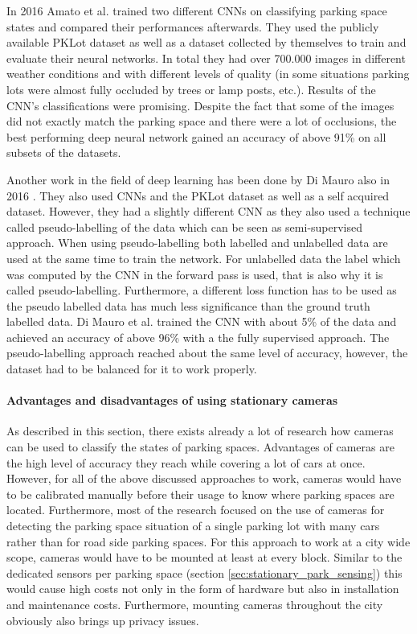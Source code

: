 In 2016 Amato et al. \cite{Amato2016} trained two different CNNs on classifying parking space states and compared their performances afterwards. They used the publicly available PKLot dataset as well as a dataset collected by themselves to train and evaluate their neural networks. In total they had over 700.000 images in different weather conditions and with different levels of quality (in some situations parking lots were almost fully occluded by trees or lamp posts, etc.). Results of the CNN's classifications were promising. Despite the fact that some of the images did not exactly match the parking space and there were a lot of occlusions, the best performing deep neural network gained an accuracy of above 91\% on all subsets of the datasets.

Another work in the field of deep learning has been done by Di Mauro also in 2016 \cite{DiMauro2016}. They also used CNNs and the PKLot dataset as well as a self acquired dataset. However, they had a slightly different CNN as they also used a technique called pseudo-labelling of the data which can be seen as semi-supervised approach. When using pseudo-labelling both labelled and unlabelled data are used at the same time to train the network. For unlabelled data the label which was computed by the CNN in the forward pass is used, that is also why it is called pseudo-labelling. Furthermore, a different loss function has to be used as the pseudo labelled data has much less significance than the ground truth labelled data. Di Mauro et al. trained the CNN with about 5\% of the data and achieved an accuracy of above 96\% with a the fully supervised approach. The pseudo-labelling approach reached about the same level of accuracy, however, the dataset had to be balanced for it to work properly.


\paragraph{Advantages and disadvantages of using stationary cameras}

As described in this section, there exists already a lot of research how cameras can be used to classify the states of parking spaces. Advantages of cameras are the high level of accuracy they reach while covering a lot of cars at once. However, for all of the above discussed approaches to work, cameras would have to be calibrated manually before their usage to know where parking spaces are located. Furthermore, most of the research focused on the use of cameras for detecting the parking space situation of a single parking lot with many cars rather than for road side parking spaces. For this approach to work at a city wide scope, cameras would have to be mounted at least at every block. Similar to the dedicated sensors per parking space (section \ref{sec:stationary_park_sensing}) this would cause high costs not only in the form of hardware but also in installation and maintenance costs. Furthermore, mounting cameras throughout the city obviously also brings up privacy issues.





